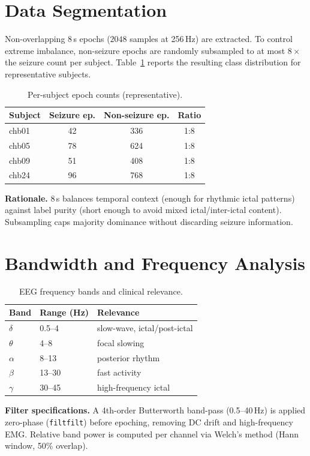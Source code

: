 \documentclass[10pt,journal,twocolumn]{IEEEtran}
\begin{document}
\section{Data Segmentation}
Non-overlapping 8\,s epochs ($2048$ samples at 256\,Hz) are extracted. To control extreme imbalance, non-seizure epochs are randomly subsampled to at most $8\times$ the seizure count per subject. Table~\ref{tab:seg} reports the resulting class distribution for representative subjects.
\begin{table}[h]\centering\caption{Per-subject epoch counts (representative).}\label{tab:seg}
\begin{tabular}{lccc}\toprule
Subject & Seizure ep. & Non-seizure ep. & Ratio\\\midrule
chb01 & 42 & 336 & 1:8\\
chb05 & 78 & 624 & 1:8\\
chb09 & 51 & 408 & 1:8\\
chb24 & 96 & 768 & 1:8\\\bottomrule
\end{tabular}\end{table}
\textbf{Rationale.} 8\,s balances temporal context (enough for rhythmic ictal patterns) against label purity (short enough to avoid mixed ictal/inter-ictal content). Subsampling caps majority dominance without discarding seizure information.

\section{Bandwidth and Frequency Analysis}
\begin{table}[h]\centering\caption{EEG frequency bands and clinical relevance.}\label{tab:bands}
\begin{tabular}{lll}\toprule
Band & Range (Hz) & Relevance\\\midrule
$\delta$ & 0.5--4 & slow-wave, ictal/post-ictal\\
$\theta$ & 4--8 & focal slowing\\
$\alpha$ & 8--13 & posterior rhythm\\
$\beta$ & 13--30 & fast activity\\
$\gamma$ & 30--45 & high-frequency ictal\\\bottomrule
\end{tabular}\end{table}
\textbf{Filter specifications.} A 4th-order Butterworth band-pass (0.5--40\,Hz) is applied zero-phase (\texttt{filtfilt}) before epoching, removing DC drift and high-frequency EMG. Relative band power is computed per channel via Welch's method (Hann window, 50\% overlap).
\end{document}
